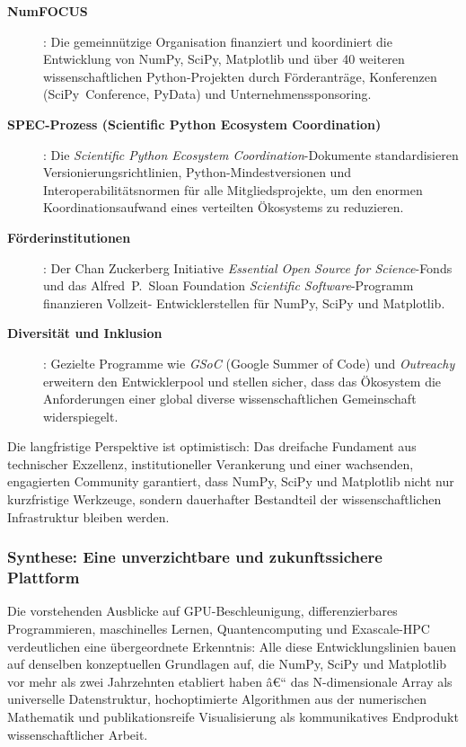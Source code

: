 \documentclass[12pt, a4paper]{article}
\begin{document}
\begin{description}
  \item[\textbf{NumFOCUS}]: Die gemeinnützige Organisation finanziert und
    koordiniert die Entwicklung von NumPy, SciPy, Matplotlib und über
    40 weiteren wissenschaftlichen Python-Projekten durch Förderanträge,
    Konferenzen (SciPy~Conference, PyData) und Unternehmenssponsoring.

  \item[\textbf{SPEC-Prozess (Scientific Python Ecosystem Coordination)}]:
    Die \emph{Scientific Python Ecosystem Coordination}-Dokumente
    standardisieren Versionierungsrichtlinien, Python-Mindestversionen
    und Interoperabilitätsnormen für alle Mitgliedsprojekte, um den
    enormen Koordinationsaufwand eines verteilten Ökosystems zu reduzieren.

  \item[\textbf{Förderinstitutionen}]: Der Chan Zuckerberg Initiative
    \emph{Essential Open Source for Science}-Fonds und das Alfred~P.~Sloan
    Foundation \emph{Scientific Software}-Programm finanzieren Vollzeit-
    Entwicklerstellen für NumPy, SciPy und Matplotlib.

  \item[\textbf{Diversität und Inklusion}]: Gezielte Programme wie
    \emph{GSoC} (Google Summer of Code) und \emph{Outreachy} erweitern
    den Entwicklerpool und stellen sicher, dass das Ökosystem die
    Anforderungen einer global diverse wissenschaftlichen Gemeinschaft
    widerspiegelt.
\end{description}

Die langfristige Perspektive ist optimistisch: Das dreifache Fundament aus
technischer Exzellenz, institutioneller Verankerung und einer wachsenden,
engagierten Community garantiert, dass NumPy, SciPy und Matplotlib nicht
nur kurzfristige Werkzeuge, sondern dauerhafter Bestandteil der
wissenschaftlichen Infrastruktur bleiben werden.

\subsubsection{Synthese: Eine unverzichtbare und zukunftssichere Plattform}
\label{subsubsec:synthese}

Die vorstehenden Ausblicke auf GPU-Beschleunigung, differenzierbares
Programmieren, maschinelles Lernen, Quantencomputing und Exascale-HPC
verdeutlichen eine übergeordnete Erkenntnis: Alle diese Entwicklungslinien
bauen auf denselben konzeptuellen Grundlagen auf, die NumPy, SciPy und
Matplotlib vor mehr als zwei Jahrzehnten etabliert haben â€“ das
N-dimensionale Array als universelle Datenstruktur, hochoptimierte
Algorithmen aus der numerischen Mathematik und publikationsreife
Visualisierung als kommunikatives Endprodukt wissenschaftlicher Arbeit.
\end{document}
